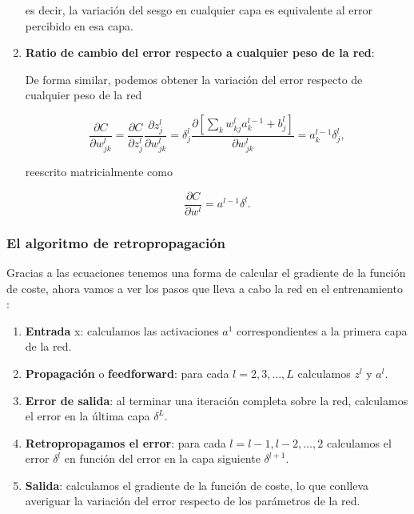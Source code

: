 \begin{appendices}
\begin{enumerate}
	es decir, la variación del sesgo en cualquier capa es equivalente al error percibido en esa capa.

	\item \textbf{Ratio de cambio del error respecto a cualquier peso de la red}:

	De forma similar, podemos obtener la variación del error respecto de cualquier peso de la red

	\begin{equation}\label{f_bp:ratio_peso}
		\frac{\partial C}{\partial w_{jk}^l} = \frac{\partial C}{\partial z_j^l}\frac{\partial z_j^l}{\partial w_{jk}^l} = \delta_j^l \frac{\partial \left[ \sum_k w_{kj}^l a_k^{l-1} + b_j^l \right]}{\partial w_{jk}^l} = a_k^{l-1} \delta_j^l,
	\end{equation}

	reescrito matricialmente como

	\begin{equation}\label{f_bp:ratio_peso_mat}
		\frac{\partial C}{\partial w^l} = a^{l-1} \delta^l.
	\end{equation}
\end{enumerate}

\subsubsection{El algoritmo de retropropagación}

Gracias a las ecuaciones tenemos una forma de calcular el gradiente de la función de coste, ahora vamos a ver los pasos que lleva a cabo la red en el entrenamiento \cite{nn_dl__michael_nielsen_2015}:

\begin{enumerate}
	\item \textbf{Entrada} x: calculamos las activaciones $a^1$ correspondientes a la primera capa de la red.
	\item \textbf{Propagación} o \textbf{feedforward}: para cada $l = 2, 3, \dots , L$ calculamos $z^l$ y $a^l$.
	\item \textbf{Error de salida}: al terminar una iteración completa sobre la red, calculamos el error en la última capa $\delta^L$.
	\item \textbf{Retropropagamos el error}: para cada $l = l-1, l-2, \dots, 2$ calculamos el error $\delta^l$ en función del error en la capa siguiente $\delta^{l+1}$.
	\item \textbf{Salida}: calculamos el gradiente de la función de coste, lo que conlleva averiguar la variación del error respecto de los parámetros de la red.
\end{enumerate}


\end{appendices}
